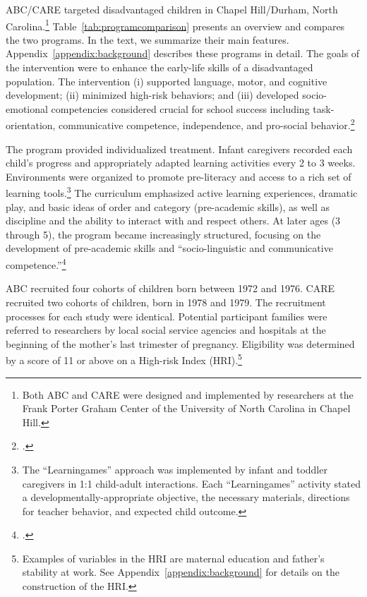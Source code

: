 ABC/CARE targeted disadvantaged children in Chapel Hill/Durham, North Carolina.\footnote{Both ABC and CARE were designed and implemented by researchers at the Frank Porter Graham Center of the University of North Carolina in Chapel Hill.} Table~\ref{tab:programcomparison} presents an overview and compares the two programs. In the text, we summarize their main features. Appendix~\ref{appendix:background} describes these programs in detail. The goals of the intervention were to enhance the early-life skills of a disadvantaged population. The intervention (i) supported language, motor, and cognitive development; (ii) minimized high-risk behaviors; and (iii) developed socio-emotional competencies considered crucial for school success including task-orientation, communicative competence, independence, and pro-social behavior.\footnote{\citet{Ramey_Collier_etal_1976_CarolinaAbecedarianProject, Ramey_etal_1985_Project-CARE_TiECSE, Sparling_1974_Synth_Edu_Infant_SPEECH, Wasik_Ramey_etal_1990_CD, Ramey-etal_2012-ABC}.}

The program provided individualized treatment. Infant caregivers recorded each child's progress and appropriately adapted learning activities every 2 to 3 weeks. Environments were organized to promote pre-literacy and access to a rich set of learning tools.\footnote{The ``Learningames'' approach was implemented by infant and toddler caregivers in 1:1 child-adult interactions. Each ``Learningames'' activity stated a developmentally-appropriate objective, the necessary materials, directions for teacher behavior, and expected child outcome.} The curriculum emphasized active learning experiences, dramatic play, and basic ideas of order and category (pre-academic skills), as well as discipline and the ability to interact with and respect others.  At later ages (3 through 5), the program became increasingly structured, focusing on the development of pre-academic skills and ``socio-linguistic and communicative competence.''\footnote{\citet{Ramey-et-al_1977_Intro-to-ABC, Haskins_1985_CD, Ramey_1981_Modification, Ramey_Campbell_1979_SR, Ramey_Smith_1977_AJMD, Ramey_McGinness_etal_1982_Abecedarianapproach, Sparling_Lewis_1979_BOOKLearninggamesFirstThree,Sparling_Lewis_1984_BOOKLearningGamesThreesFours}.}

ABC recruited four cohorts of children born between 1972 and 1976. CARE recruited two cohorts of children, born in 1978 and 1979. The recruitment processes for each study were identical. Potential participant families were referred to researchers by local social service agencies and hospitals at the beginning of the mother's last trimester of pregnancy. Eligibility was determined by a score of 11 or above on a High-risk Index (HRI).\footnote{Examples of variables in the HRI are maternal education and father's stability at work. See Appendix~\ref{appendix:background} for details on the construction of the HRI.}


